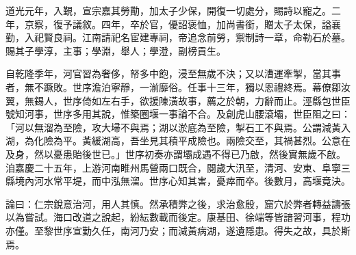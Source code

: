 \begin{pinyinscope}
道光元年，入覲，宣宗嘉其勞勩，加太子少保，開復一切處分，賜詩以寵之。二年，京察，復予議敘。四年，卒於官，優詔褒恤，加尚書銜，贈太子太保，謚襄勤，入祀賢良祠。江南請祀名宦建專祠，帝追念前勞，禦制詩一章，命勒石於墓。賜其子學淳，主事；學淵，舉人；學澄，副榜貢生。

自乾隆季年，河官習為奢侈，帑多中飽，浸至無歲不決；又以漕運牽掣，當其事者，無不蹶敗。世序澹泊寧靜，一湔靡俗。任事十三年，獨以恩禮終焉。幕僚鄒汝翼，無錫人，世序倚如左右手，欲援陳潢故事，薦之於朝，力辭而止。涇縣包世臣號知河事，世序多用其說，惟築圈堰一事論不合。及創虎山腰滾壩，世臣阻之曰：「河以無溜為至險，攻大埽不與焉；湖以淤底為至險，掣石工不與焉。公謂減黃入湖，為化險為平。黃緩湖高，吾坐見其積平成險也。兩險交至，其禍甚烈。公意在及身，然以憂患貽後世已。」世序初奏亦謂壩成遇不得已乃啟，然後實無歲不啟。洎嘉慶二十五年，上游河南睢州馬營兩口既合，閱歲大汛至，清河、安東、阜寧三縣境內河水常平堤，而中泓無溜。世序心知其害，憂瘁而卒。後數月，高堰竟決。

論曰：仁宗銳意治河，用人其慎。然承積弊之後，求治愈殷，窟穴於弊者轉益譸張以為嘗試。海口改道之說起，紛紜數載而後定。康基田、徐端等皆諳習河事，程功亦僅。至黎世序宣勤久任，南河乃安；而減黃病湖，遂遺隱患。得失之故，具於斯焉。


\end{pinyinscope}